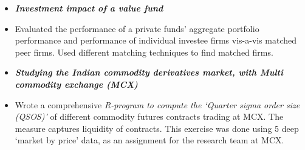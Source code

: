 \documentclass[9pt]{article}
\newenvironment{outerlist}[1][\enskip\textbullet]%
        {\begin{itemize}[#1,leftmargin=*]}{\end{itemize}%
         \vspace{-.5\baselineskip}}
\begin{document}
\begin{enumerate}
\begin{outerlist}
  \item \textbf{\textit{Investment impact of a value fund}} %
  \item[] Evaluated the performance of a private funds' aggregate
    portfolio performance and performance of individual investee firms
    vis-a-vis matched peer firms. Used different matching techniques
    to find matched firms.                                      
    
  \item \textbf{\textit{Studying the Indian commodity derivatives
        market, with Multi commodity
        exchange (MCX)}} %
  \item[] Wrote a comprehensive \textit{R-program to compute the `Quarter sigma order size (QSOS)'} of
    different commodity futures contracts trading at MCX. The measure
    captures liquidity of contracts.%
    This exercise was done using 5 deep `market by price' data, as an
    assignment for the research team at MCX.  
  \end{outerlist}                                                                               
\end{enumerate}

\end{document}
